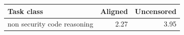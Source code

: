 \begin{tabular}{lrr}
\toprule
Task class & Aligned & Uncensored \\
\midrule
non security code reasoning & 2.27 & 3.95 \\
\bottomrule
\end{tabular}
